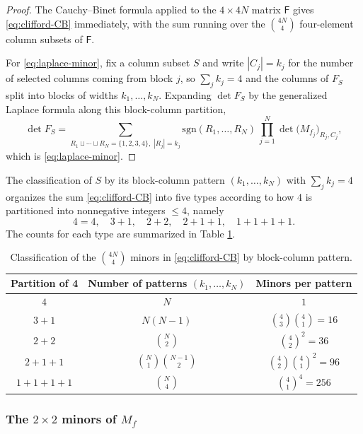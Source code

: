 \documentclass[11pt]{amsart}
\begin{document}
\begin{proof}
The Cauchy--Binet formula applied to the $4 \times 4N$ matrix $\mathsf{F}$ gives \eqref{eq:clifford-CB} immediately, with the sum running over the $\binom{4N}{4}$ four-element column subsets of $\mathsf{F}$.

For \eqref{eq:laplace-minor}, fix a column subset $S$ and write $|C_j| = k_j$ for the number of selected columns coming from block $j$, so $\displaystyle\sum_j k_j = 4$ and the columns of $ F_S$ split into blocks of widths $k_1, \ldots, k_N$. Expanding $\det F_S$ by the generalized Laplace formula along this block-column partition,
\[
\det F_S = \sum_{R_1 \sqcup \cdots \sqcup R_N = \{1,2,3,4\},\; |R_j|=k_j} \mathrm{sgn}(R_1,\ldots, R_N)\, \prod_{j=1}^N \det\bigl(M_{f_j}\bigr)_{R_j, C_j},
\]
which is \eqref{eq:laplace-minor}.
\end{proof}

\begin{rem}
The classification of $S$ by its block-column pattern $(k_1, \ldots, k_N)$ with $\sum_j k_j = 4$ organizes the sum \eqref{eq:clifford-CB} into five types according to how $4$ is partitioned into nonnegative integers $\le 4$, namely
\[
4 = 4,\quad 3+1,\quad 2+2,\quad 2+1+1,\quad 1+1+1+1.
\]
The counts for each type are summarized in Table \ref{tab:clifford-types}.
\end{rem}

\begin{table}[htbp]
\centering
\begin{tabular}{c|c|c}
Partition of 4 & Number of patterns $(k_1,\ldots,k_N)$ & Minors per pattern\\
\hline
$4$ & $N$ & $1$\\
$3+1$ & $ N(N-1)$ & $\binom{4}{3}\binom{4}{1} = 16$\\
$2+2$ & $\binom{N}{2}$ & $\binom{4}{2}^2 = 36$\\
$2+1+1$ & $\binom{N}{1}\binom{N-1}{2}$ & $\binom{4}{2}\binom{4}{1}^2 = 96$\\
$1+1+1+1$ & $\binom{N}{4}$ & $\binom{4}{1}^4 = 256$
\end{tabular}
\caption{Classification of the $\binom{4N}{4}$ minors in \eqref{eq:clifford-CB} by block-column pattern.}
\label{tab:clifford-types}
\end{table}

\subsubsection{The $2\times 2$ minors of $M_f$}
\label{app:M-minors}
\end{document}
